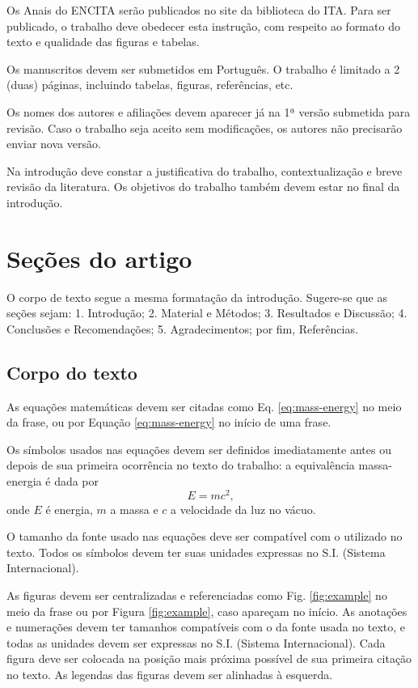 \documentclass[
	article,			%
	10pt,				%
	oneside,			%
	a4paper,			%
  twocolumn,			%
	english,			%
	brazil,				%
	sumario=tradicional,
	]{abntex2}
\begin{document}
Os Anais do ENCITA serão publicados no site da biblioteca do ITA. Para ser publicado, o
trabalho deve obedecer esta instrução, com respeito ao formato do texto e qualidade das
figuras e tabelas.

Os manuscritos devem ser submetidos em Português. O trabalho é limitado a 2 (duas)
páginas, incluindo tabelas, figuras, referências, etc.

Os nomes dos autores e afiliações devem aparecer já na 1ª versão submetida para revisão.
Caso o trabalho seja aceito sem modificações, os autores não precisarão enviar nova
versão.

Na introdução deve constar a justificativa do trabalho, contextualização e breve revisão
da literatura. Os objetivos do trabalho também devem estar no final da introdução.

\section{Seções do artigo}

O corpo de texto segue a mesma formatação da introdução. Sugere-se que as seções sejam: 1.
Introdução; 2. Material e Métodos; 3. Resultados e Discussão; 4. Conclusões e
Recomendações; 5. Agradecimentos; por fim, Referências.

\subsection{Corpo do texto}

As equações matemáticas devem ser citadas como Eq. \ref{eq:mass-energy} no meio da
frase, ou por Equação \ref{eq:mass-energy} no início de uma frase.

Os símbolos usados nas equações devem ser definidos imediatamente antes ou depois de sua
primeira ocorrência no texto do trabalho: a equivalência massa-energia é dada por
\begin{equation}
  \label{eq:mass-energy}
  E = m c^2\mbox{,}
\end{equation}
onde $E$ é energia, $m$ a massa e $c$ a velocidade da luz no vácuo.

O tamanho da fonte usado nas equações deve ser compatível com o utilizado no texto. Todos
os símbolos devem ter suas unidades expressas no S.I. (Sistema Internacional).

As figuras devem ser centralizadas e referenciadas como Fig. \ref{fig:example} no meio da
frase ou por Figura \ref{fig:example}, caso apareçam no início. As anotações e numerações
devem ter tamanhos compatíveis com o da fonte usada no texto, e todas as unidades devem
ser expressas no S.I. (Sistema Internacional). Cada figura deve ser colocada na posição
mais próxima possível de sua primeira citação no texto. As legendas das figuras devem ser
alinhadas à esquerda.
\end{document}
